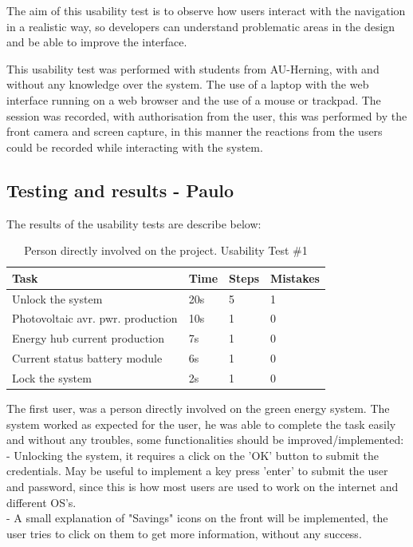 The aim of this usability test is to observe how users interact with the navigation in a realistic way, so developers can understand problematic areas in the design and be able to improve the interface.

This usability test was performed with students from AU-Herning, with and without any knowledge over the system. The use of a laptop with the web interface running on a web browser and the use of a mouse or trackpad. The session was recorded, with authorisation from the user, this was performed by the front camera and screen capture, in this manner the reactions from the users could be recorded while interacting with the system.

\subsection{Testing and results - Paulo}

The results of the usability tests are describe below:

\begin{table}[H]
	\begin{tabular}{ | l | l | l | l |}
		\hline
		Task 				 	     & 		Time 	& 	Steps 	& 	Mistakes 		\\ \hline
		Unlock the system    			     & 		20s  		& 	 5 		& 	1 			\\ \hline
		Photovoltaic avr. pwr. production  & 		10s 		& 	 1 		& 	0 			\\ \hline
		Energy hub current production 	     & 		7s 		& 	 1 		& 	0			 \\ \hline
		Current status battery module 	     & 		6s 		& 	 1 		& 	0 			 \\ \hline
		Lock the system 			     & 		2s 		& 	 1 		& 	0 			 \\ \hline
	\end{tabular}
    \caption{Person directly involved on the project. Usability Test \#1}
\end{table}

The first user, was a person directly involved on the green energy system. The system worked as expected for the user, he was able to complete the task easily and without any troubles, some functionalities should be improved/implemented:\\
- Unlocking the system, it requires a click on the 'OK' button to submit the credentials. May be useful to implement a key press 'enter' to submit the user and password, since this is how most users are used to work on the internet and different OS's.\\
- A small explanation of "Savings" icons on the front will be implemented, the user tries to click on them to get more information, without any success.\\

